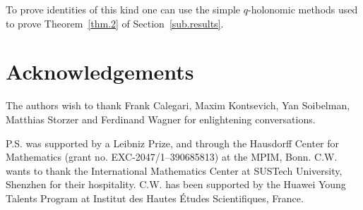 \documentclass[12pt,reqno]{amsart}
\theoremstyle{definition}
\begin{document}
To prove identities of this kind one can use the simple $q$-holonomic methods
used to prove Theorem~\ref{thm.2} of Section~\ref{sub.results}.


\section*{Acknowledgements} 

The authors wish to thank Frank Calegari, Maxim Kontsevich, Yan Soibelman,
Matthias Storzer and Ferdinand Wagner for enlightening conversations.

P.S. was supported by a Leibniz Prize, and through the
Hausdorff Center for Mathematics (grant no. EXC-2047/1–390685813) at the MPIM,
Bonn. C.W. wants to thank the International Mathematics Center at SUSTech University,
Shenzhen for their hospitality. C.W. has been supported by the Huawei Young Talents
Program at Institut des Hautes Études Scientifiques, France.

\vspace{-0.05in}

% 


\end{document}
